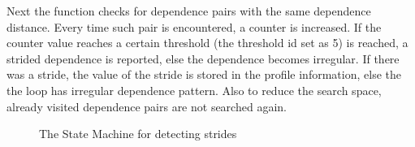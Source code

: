 \documentclass[10pt]{report}          %
\begin{document}
Next the function checks for dependence pairs with the same dependence distance.  Every time such pair is encountered, a counter is increased.  If the counter value reaches a certain threshold (the threshold id set as 5) is reached, a strided dependence is reported, else the dependence becomes irregular. If there was a stride, the value of the stride is stored in the profile information, else the the loop has irregular dependence pattern. Also to reduce the search space, already visited dependence pairs are not searched again.\\

\begin{figure}[h]
\begin{center}
\renewcommand{\figure}{Fig.}
\caption{ The State Machine for detecting strides}
\end{center}
\label{fig:stride}
\end{figure}
\end{document}
